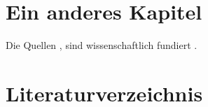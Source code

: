 \documentclass[a4paper, 11pt]{article}
\begin{document}
\newpage

\section{Ein anderes Kapitel}

Die Quellen \cite{bi:book1}, \cite{bi:book2} sind wissenschaftlich fundiert \cite{bi:book3}.

\newpage

\section*{Literaturverzeichnis}
\label{sec:literaturverzeichnis}

\begingroup
\renewcommand{\section}[2]{}%

\endgroup
\end{document}
